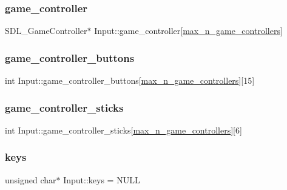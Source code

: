 \subsubsection{\texorpdfstring{game\+\_\+controller}{game\_controller}}
{\footnotesize\ttfamily S\+D\+L\+\_\+\+Game\+Controller$\ast$ Input\+::game\+\_\+controller\mbox{[}\mbox{\hyperlink{namespace_input_a9fd846153f42bd341dabd1a5764284be}{max\+\_\+n\+\_\+game\+\_\+controllers}}\mbox{]}}

\mbox{\label{namespace_input_a61ef1ee2bd1ce6464348ff388e221203}} 
\subsubsection{\texorpdfstring{game\+\_\+controller\+\_\+buttons}{game\_controller\_buttons}}
{\footnotesize\ttfamily int Input\+::game\+\_\+controller\+\_\+buttons\mbox{[}\mbox{\hyperlink{namespace_input_a9fd846153f42bd341dabd1a5764284be}{max\+\_\+n\+\_\+game\+\_\+controllers}}\mbox{]}\mbox{[}15\mbox{]}}

\mbox{\label{namespace_input_aea08108c1d4e370b0de73970baf87430}} 
\subsubsection{\texorpdfstring{game\+\_\+controller\+\_\+sticks}{game\_controller\_sticks}}
{\footnotesize\ttfamily int Input\+::game\+\_\+controller\+\_\+sticks\mbox{[}\mbox{\hyperlink{namespace_input_a9fd846153f42bd341dabd1a5764284be}{max\+\_\+n\+\_\+game\+\_\+controllers}}\mbox{]}\mbox{[}6\mbox{]}}

\mbox{\label{namespace_input_addbf18576980ba9c1970d40a3d56d3db}} 
\subsubsection{\texorpdfstring{keys}{keys}}
{\footnotesize\ttfamily unsigned char$\ast$ Input\+::keys = N\+U\+LL}

